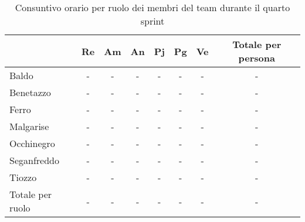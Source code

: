 \begin{table}[!h]
    \centering
    \begin{tabular}{ | l | c | c | c | c | c | c | c | }
        \hline
        \textbf{} & \textbf{Re} & \textbf{Am} &\textbf{An} & \textbf{Pj} & \textbf{Pg} & \textbf{Ve} & \textbf{Totale per persona} \\
        \hline
        Baldo            &  -   &  -   &  -   &  -   &  -   &  -   &  -   \\
        Benetazzo        &  -   &  -   &  -   &  -   &  -   &  -   &  -   \\
        Ferro            &  -   &  -   &  -   &  -   &  -   &  -   &  -   \\
        Malgarise        &  -   &  -   &  -   &  -   &  -   &  -   &  -   \\
        Occhinegro       &  -   &  -   &  -   &  -   &  -   &  -   &  -   \\
        Seganfreddo      &  -   &  -   &  -   &  -   &  -   &  -   &  -   \\
        Tiozzo           &  -   &  -   &  -   &  -   &  -   &  -   &  -   \\
        \hline
        Totale per ruolo &  -   &  -   &  -   &  -   &  -   &  -   &  -   \\
        \hline
    \end{tabular}
    \caption{Consuntivo orario per ruolo dei membri del team durante il quarto sprint} %
    \label{tab:26} %
\end{table}
